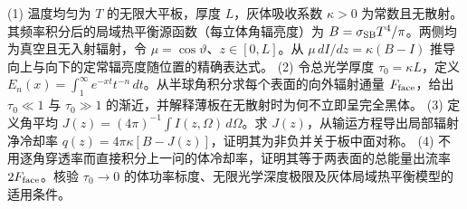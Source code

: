 (1) 温度均匀为 \(T\) 的无限大平板，厚度 \(L\)，灰体吸收系数 \(\kappa>0\) 为常数且无散射。其频率积分后的局域热平衡源函数（每立体角辐亮度）为 \(B=\sigma_{\rm SB}T^4/\pi\)。两侧均为真空且无入射辐射，令 \(\mu=\cos\vartheta\)、\(z\in[0,L]\)。从 \(\mu\,dI/dz=\kappa(B-I)\) 推导向上与向下的定常辐亮度随位置的精确表达式。
(2) 令总光学厚度 \(\tau_0=\kappa L\)，定义 \(E_n(x)=\int_1^\infty e^{-xt}t^{-n}\,dt\)。从半球角积分求每个表面的向外辐射通量 \(F_{\rm face}\)，给出 \(\tau_0\ll1\) 与 \(\tau_0\gg1\) 的渐近，并解释薄板在无散射时为何不立即呈完全黑体。
(3) 定义角平均 \(J(z)=(4\pi)^{-1}\int I(z,\Omega)\,d\Omega\)。求 \(J(z)\)，从输运方程导出局部辐射净冷却率 \(q(z)=4\pi\kappa[B-J(z)]\)，证明其为非负并关于板中面对称。
(4) 不用逐角穿透率而直接积分上一问的体冷却率，证明其等于两表面的总能量出流率 \(2F_{\rm face}\)。核验 \(\tau_0\to0\) 的体功率标度、无限光学深度极限及灰体局域热平衡模型的适用条件。
